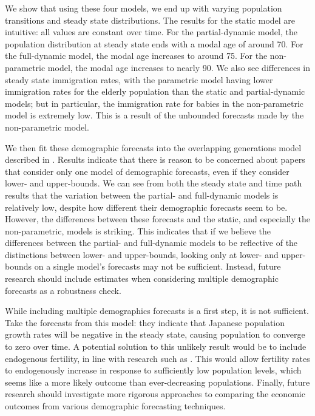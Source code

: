 \documentclass[10pt]{article}
\numberwithin{equation}{subsection}
\begin{document}
\par We show that using these four models, we end up with varying population transitions and steady state distributions. The results for the static model are intuitive: all values are constant over time. For the partial-dynamic model, the population distribution at steady state ends with a modal age of around 70. For the full-dynamic model, the modal age increases to around 75. For the non-parametric model, the modal age increases to nearly 90. We also see differences in steady state immigration rates, with the parametric model having lower immigration rates for the elderly population than the static and partial-dynamic models; but in particular, the immigration rate for babies in the non-parametric model is extremely low. This is a result of the unbounded forecasts made by the non-parametric model.

\par We then fit these demographic forecasts into the overlapping generations model described in \cite{E2020}. Results indicate that there is reason to be concerned about papers that consider only one model of demographic forecasts, even if they consider lower- and upper-bounds. We can see from both the steady state and time path results that the variation between the partial- and full-dynamic models is relatively low, despite how different their demographic forecasts seem to be. However, the differences between these forecasts and the static, and especially the non-parametric, models is striking. This indicates that if we believe the differences between the partial- and full-dynamic models to be reflective of the distinctions between lower- and upper-bounds, looking only at lower- and upper-bounds on a single model's forecasts may not be sufficient. Instead, future research should include estimates when considering multiple demographic forecasts as a robustness check.

\par While including multiple demographics forecasts is a first step, it is not sufficient. Take the forecasts from this model: they indicate that Japanese population growth rates will be negative in the steady state, causing population to converge to zero over time. A potential solution to this unlikely result would be to include endogenous fertility, in line with research such as \cite{BB1989}. This would allow fertility rates to endogenously increase in response to sufficiently low population levels, which seems like a more likely outcome than ever-decreasing populations. Finally, future research should investigate more rigorous approaches to comparing the economic outcomes from various demographic forecasting techniques.
\end{document}
